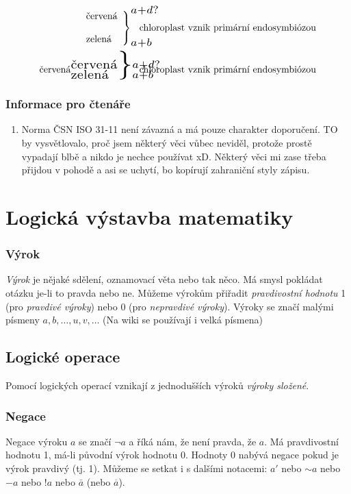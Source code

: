 \documentclass[12pt]{article}
\begin{document}
\begin{align*}
 \left.
    \begin{array}{ll}
       \text{červená} \\
       \\
       \text{zelená}
    \end{array}
\right\}_{\scaleto{a+b}{9pt}}^{\scaleto{a+d?}{9pt}} \mspace{-40mu} \text{chloroplast vznik primární endosymbiózou}\\
       \text{červená}
 {^{\scaleto{\text{červená}}{9pt}}_{\scaleto{\text{zelená}}{9pt}}}\scaleto{ \}}{30pt}
_{\scaleto{a+b}{9pt}}^{\scaleto{a+d?}{9pt}} \mspace{-40mu} \text{chloroplast vznik primární endosymbiózou}
\end{align*} %

\subsubsection{Informace pro čtenáře}
\begin{enumerate}
\item Norma ČSN ISO 31-11 není závazná a má pouze charakter doporučení. TO by vysvětlovalo, proč jsem některý věci vůbec neviděl, protože prostě vypadají blbě a nikdo je nechce používat xD. Některý věci mi zase třeba přijdou v pohodě a asi se uchytí, bo kopírují zahraniční styly zápisu.
\end{enumerate}


\section{Logická výstavba matematiky}
\subsubsection{Výrok}
\emph{Výrok} je nějaké sdělení, oznamovací věta nebo tak něco. Má smysl pokládat otázku je-li to pravda nebo ne. Můžeme výrokům přiřadit \emph{pravdivostní hodnotu} 1 (pro \emph{pravdivé výroky}) nebo 0 (pro \emph{nepravdivé výroky}). Výroky se značí malými písmeny $a,b, \dotsc, u,v, \dotsc$ (Na wiki se používají i velká písmena)
\subsection{Logické operace}
Pomocí logických operací vznikají z jednodušších výroků \emph{výroky složené}.
\subsubsection{Negace}
Negace výroku $a$ se značí $\neg a$ a říká nám, že není pravda, že $a$. Má pravdivostní hodnotu 1, má-li původní výrok hodnotu 0. Hodnoty 0 nabývá negace pokud je výrok pravdivý (tj. 1). Můžeme se setkat i s dalšími notacemi: $a'$ nebo $\sim a$ nebo $-a$ nebo $!a$ nebo $\bar{a}$ (nebo $\overline{a}$).
\end{document}
